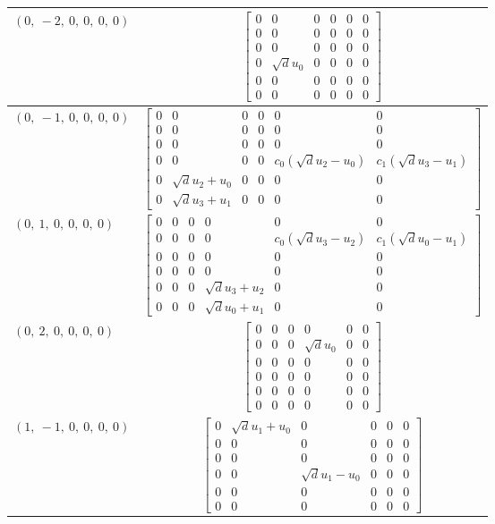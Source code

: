 \documentclass[11pt]{article}
\theoremstyle{definition}
\begin{document}
\begin{longtable}{|l|c|}
    \hline
    $\left( 0, \  -2, \  0, \  0, \  0, \  0\right)$ & ${\left[\begin{matrix}0 & 0 & 0 & 0 & 0 & 0\\0 & 0 & 0 & 0 & 0 & 0\\0 & 0 & 0 & 0 & 0 & 0\\0 & \sqrt{d} u_{0} & 0 & 0 & 0 & 0\\0 & 0 & 0 & 0 & 0 & 0\\0 & 0 & 0 & 0 & 0 & 0\end{matrix}\right]}$ \\
    \hline
    $\left( 0, \  -1, \  0, \  0, \  0, \  0\right)$ & ${\left[\begin{matrix}0 & 0 & 0 & 0 & 0 & 0\\0 & 0 & 0 & 0 & 0 & 0\\0 & 0 & 0 & 0 & 0 & 0\\0 & 0 & 0 & 0 & c_{0} \left(\sqrt{d} u_{2} - u_{0}\right) & c_{1} \left(\sqrt{d} u_{3} - u_{1}\right)\\0 & \sqrt{d} u_{2} + u_{0} & 0 & 0 & 0 & 0\\0 & \sqrt{d} u_{3} + u_{1} & 0 & 0 & 0 & 0\end{matrix}\right]}$ \\
    \hline
    $\left( 0, \  1, \  0, \  0, \  0, \  0\right)$ & ${\left[\begin{matrix}0 & 0 & 0 & 0 & 0 & 0\\0 & 0 & 0 & 0 & c_{0} \left(\sqrt{d} u_{3} - u_{2}\right) & c_{1} \left(\sqrt{d} u_{0} - u_{1}\right)\\0 & 0 & 0 & 0 & 0 & 0\\0 & 0 & 0 & 0 & 0 & 0\\0 & 0 & 0 & \sqrt{d} u_{3} + u_{2} & 0 & 0\\0 & 0 & 0 & \sqrt{d} u_{0} + u_{1} & 0 & 0\end{matrix}\right]}$ \\
    \hline
    $\left( 0, \  2, \  0, \  0, \  0, \  0\right)$ & ${\left[\begin{matrix}0 & 0 & 0 & 0 & 0 & 0\\0 & 0 & 0 & \sqrt{d} u_{0} & 0 & 0\\0 & 0 & 0 & 0 & 0 & 0\\0 & 0 & 0 & 0 & 0 & 0\\0 & 0 & 0 & 0 & 0 & 0\\0 & 0 & 0 & 0 & 0 & 0\end{matrix}\right]}$ \\
    \hline
    $\left( 1, \  -1, \  0, \  0, \  0, \  0\right)$ & ${\left[\begin{matrix}0 & \sqrt{d} u_{1} + u_{0} & 0 & 0 & 0 & 0\\0 & 0 & 0 & 0 & 0 & 0\\0 & 0 & 0 & 0 & 0 & 0\\0 & 0 & \sqrt{d} u_{1} - u_{0} & 0 & 0 & 0\\0 & 0 & 0 & 0 & 0 & 0\\0 & 0 & 0 & 0 & 0 & 0\end{matrix}\right]}$ \\

\end{longtable}
\end{document}
